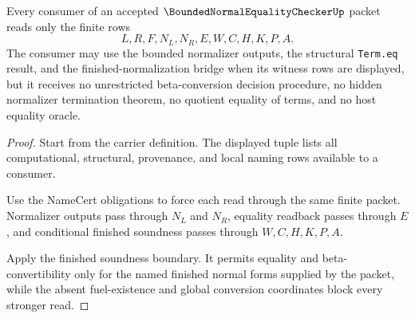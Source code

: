 \begin{theorem}
\label{thm:bounded-normal-equality-checker-consumer-nonescape}
Every consumer of an accepted $\BoundedNormalEqualityCheckerUp$ packet reads
only the finite rows
$$
L,R,F,N_L,N_R,E,W,C,H,K,P,A.
$$
The consumer may use the bounded normalizer outputs, the structural
\texttt{Term.eq} result, and the finished-normalization bridge when its
witness rows are displayed, but it receives no unrestricted beta-conversion
decision procedure, no hidden normalizer termination theorem, no quotient
equality of terms, and no host equality oracle.
\end{theorem}
\begin{proof}
Start from the carrier definition. The displayed tuple lists all computational,
structural, provenance, and local naming rows available to a consumer.

Use the NameCert obligations to force each read through the same finite packet.
Normalizer outputs pass through $N_L$ and $N_R$, equality readback passes
through $E$, and conditional finished soundness passes through $W,C,H,K,P,A$.

Apply the finished soundness boundary. It permits equality and
beta-convertibility only for the named finished normal forms supplied by the
packet, while the absent fuel-existence and global conversion coordinates block
every stronger read.
\end{proof}

